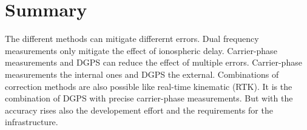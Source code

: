 \section{Summary}

The different methods can mitigate differernt errors.
Dual frequency measurements only mitigate the effect of ionospheric delay.
Carrier-phase measurements and DGPS can reduce the effect of multiple errors.
Carrier-phase measurements the internal ones and DGPS the external.
Combinations of correction methods are also possible like real-time kinematic (RTK).
It is the combination of DGPS with precise carrier-phase measurements.
But with the accuracy rises also the developement effort and the requirements for the infrastructure.